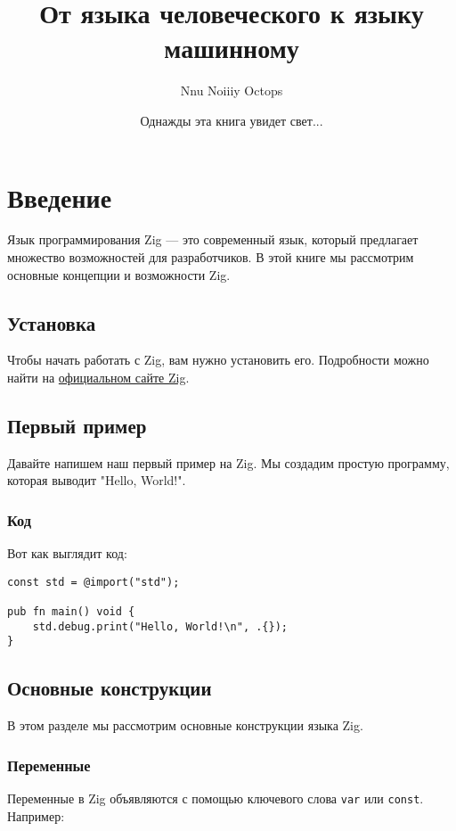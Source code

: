 \documentclass[a4paper, twoside, openany]{book}
\title{От языка человеческого к языку машинному}
\author{Nnu Noiiiy Octops}
\date{Однажды эта книга увидет свет...}
\begin{document}
\maketitle

\tableofcontents

\chapter{Введение}
 \fontsize{14pt}{14pt}\selectfont
 Язык программирования Zig — это современный язык, который предлагает множество возможностей
 для разработчиков. В этой книге мы рассмотрим основные концепции и возможности Zig.

\section{Установка}
 \fontsize{14pt}{14pt}\selectfont
 Чтобы начать работать с Zig, вам нужно установить его. Подробности можно найти на
 \href{https://ziglang.org/download/}{официальном сайте Zig}.

\section{Первый пример}
 \fontsize{14pt}{14pt}\selectfont
Давайте напишем наш первый пример на Zig. Мы создадим простую программу, которая выводит "Hello, World!".

\subsection{Код}
 \fontsize{14pt}{14pt}\selectfont
Вот как выглядит код:

\begin{lstlisting}[language=Zig, caption={Пример на Zig}]
const std = @import("std");

pub fn main() void {
    std.debug.print("Hello, World!\n", .{});
}
\end{lstlisting}

\section{Основные конструкции}
 \fontsize{14pt}{14pt}\selectfont
В этом разделе мы рассмотрим основные конструкции языка Zig.

\subsection{Переменные}
 \fontsize{14pt}{14pt}\selectfont
Переменные в Zig объявляются с помощью ключевого слова \texttt{var} или \texttt{const}. Например:
\end{document}
